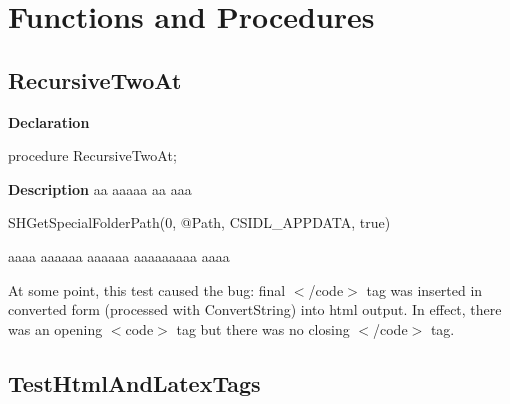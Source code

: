 \documentclass{report}
\newif\ifpdf
\begin{document}
\section{Functions and Procedures}
\ifpdf
\subsection*{\large{\textbf{RecursiveTwoAt}}\normalsize\hspace{1ex}\hrulefill}
\else
\subsection*{RecursiveTwoAt}
\fi
\label{ok_expanding_descriptions-RecursiveTwoAt}
\begin{list}{}{
\setlength{\itemindent}{0cm}
\setlength{\listparindent}{0cm}
\setlength{\leftmargin}{\evensidemargin}
\addtolength{\leftmargin}{\tmplength}
\settowidth{\labelsep}{X}
\addtolength{\leftmargin}{\labelsep}
\setlength{\labelwidth}{\tmplength}
}
\item[\textbf{Declaration}\hfill]
\ifpdf
\begin{flushleft}
\fi
\begin{ttfamily}
procedure RecursiveTwoAt;\end{ttfamily}

\ifpdf
\end{flushleft}
\fi

\par
\item[\textbf{Description}]
aa aaaaa aa aaa \begin{ttfamily}SHGetSpecialFolderPath(0, @Path, CSIDL{\_}APPDATA, true)\end{ttfamily} aaaa aaaaaa aaaaaa aaaaaaaaa aaaa

At some point, this test caused the bug: final {$<$}/code{$>$} tag was inserted in converted form (processed with ConvertString) into html output. In effect, there was an opening {$<$}code{$>$} tag but there was no closing {$<$}/code{$>$} tag.

\end{list}
\ifpdf
\subsection*{\large{\textbf{TestHtmlAndLatexTags}}\normalsize\hspace{1ex}\hrulefill}
\else
\end{document}
